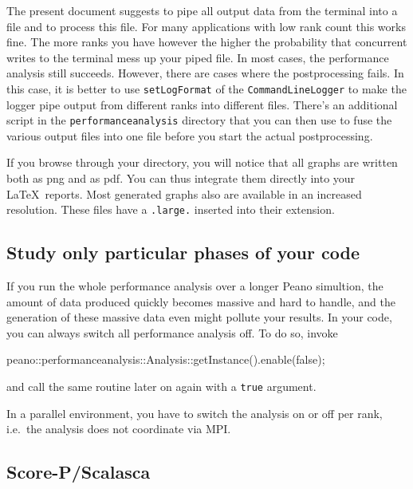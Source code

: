 \begin{remark}
The present document suggests to pipe all output data from the terminal into a
file and to process this file. 
For many applications with low rank count this works fine.
The more ranks you have however the higher the probability that concurrent
writes to the terminal mess up your piped file.
In most cases, the performance analysis still succeeds. 
However, there are cases where the postprocessing fails.
In this case, it is better to use \texttt{setLogFormat} of the
\texttt{CommandLineLogger} to make the logger pipe output from different ranks
into different files.
There's an additional script in the \texttt{performanceanalysis} directory that
you can then use to fuse the various output files into one file before you start
the actual postprocessing.
\end{remark}



\noindent
If you browse through your directory, you will notice that all graphs are
written both as png and as pdf. 
You can thus integrate them directly into your \LaTeX\ reports.
Most generated graphs also are available in an increased resolution. 
These files have a \texttt{.large.} inserted into their extension.


\subsection*{Study only particular phases of your code}

If you run the whole performance analysis over a longer Peano simultion, the
amount of data produced quickly becomes massive and hard to handle, and the generation of
these massive data even might pollute your results. 
In your code, you can always switch all performance analysis off. 
To do so, invoke
\begin{code}
  peano::performanceanalysis::Analysis::getInstance().enable(false);
\end{code}

\noindent
and call the same routine later on again with a \texttt{true} argument.

In a parallel environment, you have to switch the analysis on or off per rank,
i.e.~the analysis does not coordinate via MPI. 

\subsection*{Score-P/Scalasca}

